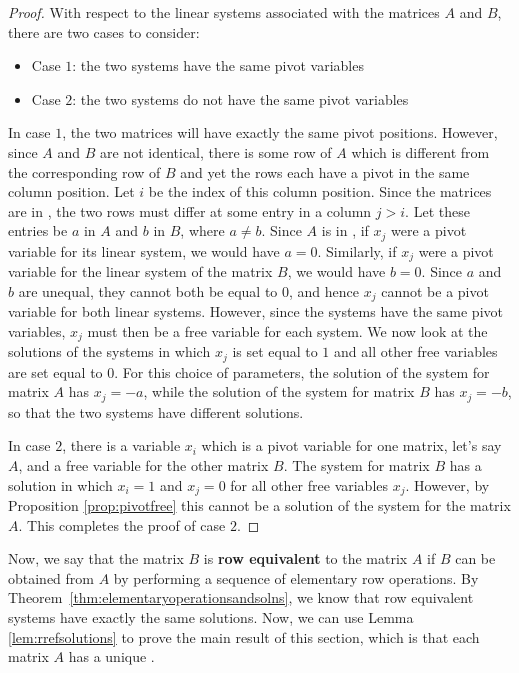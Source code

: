 \begin{proof}
With respect to the linear systems associated with the matrices $A$ and $B$, there are two cases to consider:
\begin{itemize}
\item Case $1$: the two systems have the same pivot variables
\item Case $2$: the two systems do not have the same pivot variables
\end{itemize}
In case $1$, the two matrices will have exactly the same pivot positions. However, since $A$ and $B$ are not identical, there is some row of $A$ which is different from the corresponding row of $B$ and yet the rows each have a pivot in the same column position. Let $i$ be the index of this column position. Since the matrices are in {\rref}, the two rows must differ at some entry in a column $j>i$. Let these entries be $a$ in $A$ and $b$ in $B$, where $a \neq b$. Since $A$ is in {\rref}, if $x_j$ were a pivot variable for its linear system, we would have $a=0$. Similarly, if $x_j$ were a pivot variable for the linear system of the matrix $B$, we would have $b=0$. Since $a$ and $b$ are unequal, they cannot both be equal to $0$, and hence $x_j$ cannot be a pivot variable for both linear systems. However, since the systems have the same pivot variables, $x_j$ must then be a free variable for each system. We now look at the solutions of the systems in which $x_j$ is set equal to $1$ and all other free variables are set equal to $0$. For this choice of parameters, the solution of the system for matrix $A$ has $x_j=-a$, while the solution of the system for matrix $B$ has $x_j=-b$, so that the two systems have different solutions.

In case $2$, there is a variable $x_i$ which is a pivot variable for one matrix, let's say $A$, and a free variable for the other matrix $B$. The system for matrix $B$ has a solution in which $x_i=1$ and $x_j=0$ for all other free variables $x_j$. However, by Proposition \ref{prop:pivotfree} this cannot be a solution of the system for the matrix $A$. This completes the proof of case $2$.
\end{proof}

Now, we say that the matrix $B$ is \textbf{row equivalent} to the matrix $A$ if $B$ can be obtained from $A$ by performing a sequence of elementary row operations. By Theorem~\ref{thm:elementaryoperationsandsolns}, we know that row equivalent systems have exactly the same solutions. Now, we can use Lemma \ref{lem:rrefsolutions} to prove the main result of this section, which is that each matrix $A$ has a unique {\rref}.

